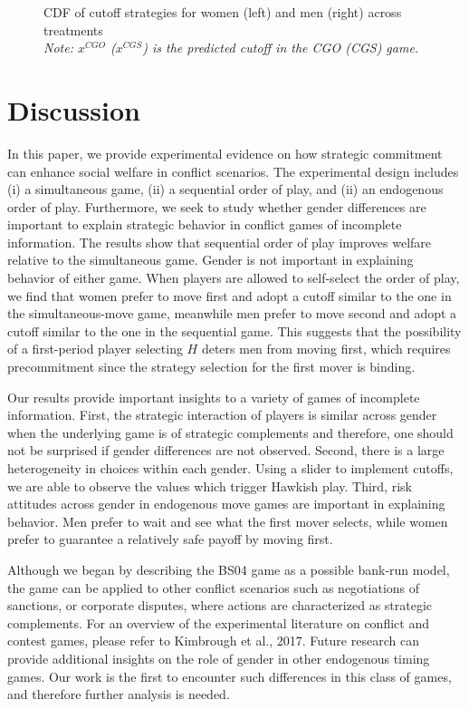 \documentclass[12pt, letterpaper]{article}
\theoremstyle{plain}
\begin{document}
\begin{center}
\begin{figure}[ht]
\begin{minipage}[t]{0.45\columnwidth}
\end{minipage} 
\caption{CDF of cutoff strategies for women (left) and men (right) across treatments\\\footnotesize{\textit{Note: $x^{CGO}$ ($x^{CGS}$) is the predicted cutoff in the CGO (CGS) game.}}}
\label{fig:cdfall}\end{figure}
\par\end{center}

\section{Discussion}
\label{sec:discuss}

In this paper, we provide experimental evidence on how strategic commitment can enhance social welfare in conflict scenarios. The experimental design includes (i) a simultaneous game, (ii) a sequential order of play, and (ii) an endogenous order of play. Furthermore, we seek to study whether gender differences are important to explain strategic behavior in conflict games of incomplete information. The results show that sequential order of play improves welfare relative to the simultaneous game. Gender is not important in explaining behavior of either game. When players are allowed to self-select the order of play, we find that women prefer to move first and adopt a cutoff similar to the one in the simultaneous-move game, meanwhile men prefer to move second and adopt a cutoff similar to the one in the sequential game. This suggests that the possibility of a first-period player selecting $H$ deters men from moving first, which requires precommitment since the strategy selection for the first mover is binding. 

Our results provide important insights to a variety of games of incomplete information. First, the strategic interaction of players is similar across gender when the underlying game is of strategic complements and therefore, one should not be surprised if gender differences are not observed. Second, there is a large heterogeneity in choices within each gender. Using a slider to implement cutoffs, we are able to observe the values which trigger Hawkish play. Third, risk attitudes across gender in endogenous move games are important in explaining behavior. Men prefer to wait and see what the first mover selects, while women prefer to guarantee a relatively safe payoff by moving first.  

Although we began by describing the BS04 game as a possible bank-run model, the game can be applied to other conflict scenarios such as negotiations of sanctions, or corporate disputes, where actions are characterized as strategic complements. For an overview of the experimental literature on conflict and contest games, please refer to Kimbrough et al., 2017. Future research can provide additional insights on the role of gender in other endogenous timing games. Our work is the first to encounter such differences in this class of games, and therefore further analysis is needed.  
\end{document}
